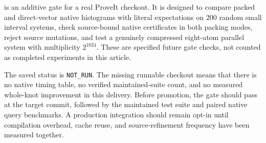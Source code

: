  is an additive gate for a real ProveIt
checkout. It is designed to compare packed and direct-vector native
histograms with literal expectations on 200 random small interval systems,
check source-bound native certificates in both packing modes, reject source
mutations, and test a genuinely compressed eight-atom parallel system with
multiplicity $2^{1024}$. These are specified future gate checks, not counted
as completed experiments in this article.

The saved status is \texttt{NOT\_RUN}. The missing runnable checkout means
that there is no native timing table, no verified maintained-suite count,
and no measured whole-knot improvement in this delivery. Before promotion,
the gate should pass at the target commit, followed by the maintained test
suite and paired native query benchmarks. A production integration should
remain opt-in until compilation overhead, cache reuse, and source-refinement
frequency have been measured together.
